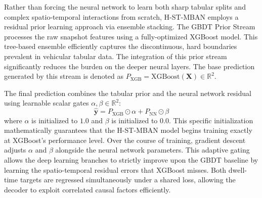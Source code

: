 \documentclass[journal]{IEEEtran}
\begin{document}
Rather than forcing the neural network to learn both sharp tabular splits and complex spatio-temporal interactions from scratch, H-ST-MBAN employs a residual prior learning approach via ensemble stacking.
The GBDT Prior Stream processes the raw snapshot features using a fully-optimized XGBoost model.
This tree-based ensemble efficiently captures the discontinuous, hard boundaries prevalent in vehicular tabular data.
The integration of this prior stream significantly reduces the burden on the deeper neural layers.
The base prediction generated by this stream is denoted as $P_\text{XGB} = \text{XGBoost}(\mathbf{X}) \in \mathbb{R}^2$.

The final prediction combines the tabular prior and the neural network residual using learnable scalar gates $\alpha, \beta \in \mathbb{R}^2$:
\begin{equation}
\hat{\mathbf{y}} = P_\text{XGB} \odot \alpha + P_\text{NN} \odot \beta
\label{eq:fusion_gate}
\end{equation}
where $\alpha$ is initialized to $1.0$ and $\beta$ is initialized to $0.0$.
This specific initialization mathematically guarantees that the H-ST-MBAN model begins training exactly at XGBoost's performance level.
Over the course of training, gradient descent adjusts $\alpha$ and $\beta$ alongside the neural network parameters.
This adaptive gating allows the deep learning branches to strictly improve upon the GBDT baseline by learning the spatio-temporal residual errors that XGBoost misses.
Both dwell-time targets are regressed simultaneously under a shared loss, allowing the decoder to exploit correlated causal factors efficiently.

\end{document}
